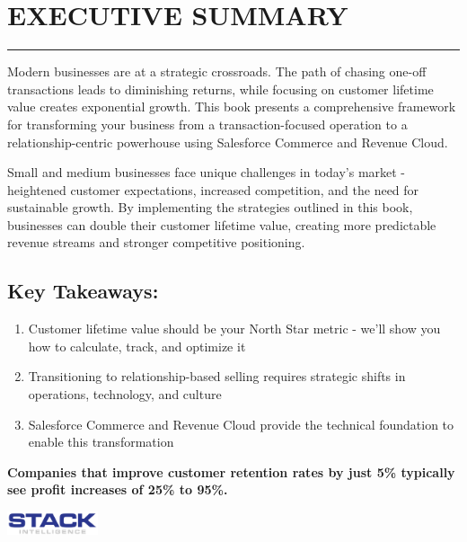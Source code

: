 \chapter*{EXECUTIVE SUMMARY}

\textcolor[HTML]{2a368e}{\rule{\textwidth}{2pt}}

Modern businesses are at a strategic crossroads. The path of chasing one-off transactions leads to diminishing returns, while focusing on customer lifetime value creates exponential growth. This book presents a comprehensive framework for transforming your business from a transaction-focused operation to a relationship-centric powerhouse using Salesforce Commerce and Revenue Cloud.

Small and medium businesses face unique challenges in today's market - heightened customer expectations, increased competition, and the need for sustainable growth. By implementing the strategies outlined in this book, businesses can double their customer lifetime value, creating more predictable revenue streams and stronger competitive positioning.

\section*{Key Takeaways:}

\begin{enumerate}
  \item Customer lifetime value should be your North Star metric - we'll show you how to calculate, track, and optimize it
  \item Transitioning to relationship-based selling requires strategic shifts in operations, technology, and culture
  \item Salesforce Commerce and Revenue Cloud provide the technical foundation to enable this transformation
\end{enumerate}

\begin{tcolorbox}[colframe=EB7527, boxrule=1mm, arc=0mm]
\textbf{Companies that improve customer retention rates by just 5\% typically see profit increases of 25\% to 95\%.}
\end{tcolorbox}

\begin{flushright}
\includegraphics[width=0.2\textwidth]{../brand-assets/images/Stack Intelligence Words Only.png}
\end{flushright}